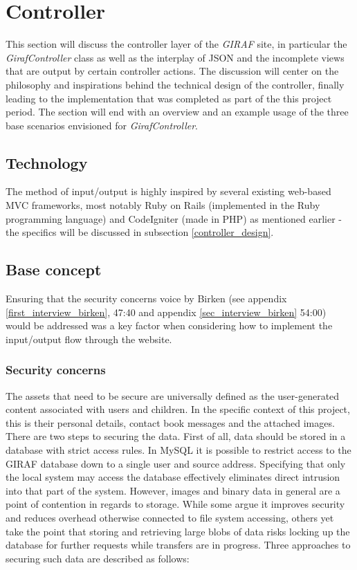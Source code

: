 \section{Controller}
\label{controller}
This section will discuss the controller layer of the \emph{GIRAF} site, in particular the \emph{GirafController} class as well as the interplay of JSON and the incomplete views that are output by certain controller actions. The discussion will center on the philosophy and inspirations behind the technical design of the controller, finally leading to the implementation that was completed as part of the this project period. The section will end with an overview and an example usage of the three base scenarios envisioned for \emph{GirafController}.

\subsection{Technology}
The method of input/output is highly inspired by several existing web-based MVC frameworks, most notably Ruby on Rails (implemented in the Ruby programming language) and CodeIgniter (made in PHP) as mentioned earlier - the specifics will be discussed in subsection \vref{controller_design}.

\subsection{Base concept}
Ensuring that the security concerns voice by Birken (see appendix \vref{first_interview_birken}, 47:40 and appendix \vref{sec_interview_birken} 54:00) would be addressed was a key factor when considering how to implement the input/output flow through the website.

\subsubsection*{Security concerns}
The assets that need to be secure are universally defined as the user-generated content associated with users and children. In the specific context of this project, this is their personal details, contact book messages and the attached images. There are two steps to securing the data. First of all, data should be stored in a database with strict access rules. In MySQL it is possible to restrict access to the GIRAF database down to a single user and source address. Specifying that only the local system may access the database effectively eliminates direct intrusion into that part of the system. However, images and binary data in general are a point of contention in regards to storage. While some argue it improves security and reduces overhead otherwise connected to file system accessing, others yet take the point that storing and retrieving large blobs of data risks locking up the database for further requests while transfers are in progress. Three approaches to securing such data are described as follows:

